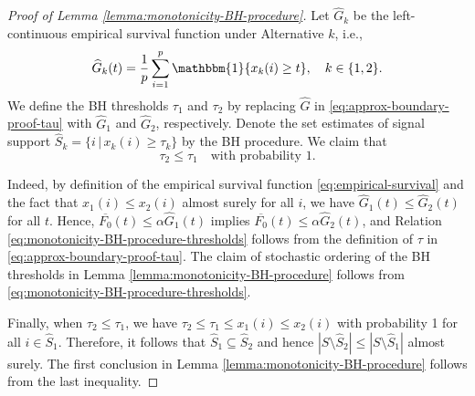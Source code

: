 \begin{proof}[Proof of Lemma \ref{lemma:monotonicity-BH-procedure}]
Let $\widehat{G}_k$ be the left-continuous empirical survival function under Alternative $k$, i.e.,
\begin{equation} \label{eq:empirical-survival}
    \widehat{G}_k(t) = \frac{1}{p}\sum_{i=1}^p\mathbbm{1}\{x_k(i) \ge t\}, \quad k\in\{1,2\}.
\end{equation}
We define the BH thresholds $\tau_1$ and $\tau_2$ by replacing $\widehat{G}$ in \eqref{eq:approx-boundary-proof-tau} with $\widehat{G}_1$ and $\widehat{G}_2$, respectively.
Denote the set estimates of signal support $\widehat{S}_k = \{i\,|\,x_k(i)\ge\tau_k\}$ by the BH procedure.
We claim that 
\begin{equation} \label{eq:monotonicity-BH-procedure-thresholds}
    \tau_2 \le \tau_1 \quad \text{with probability } 1.
\end{equation}

Indeed, by definition of the empirical survival function \eqref{eq:empirical-survival} and the fact that $x_1(i) \le x_2(i)$ almost surely for all $i$,  we have $\widehat{G}_1(t) \le \widehat{G}_2(t)$ for all $t$.
Hence, $\overline{F_0}(t)\le\alpha\widehat{G}_1(t)$ implies $\overline{F_0}(t)\le\alpha\widehat{G}_2(t)$, and Relation \eqref{eq:monotonicity-BH-procedure-thresholds} follows from the definition of $\tau$ in \eqref{eq:approx-boundary-proof-tau}.
The claim of stochastic ordering of the \ac{BH} thresholds in Lemma \ref{lemma:monotonicity-BH-procedure} follows from \eqref{eq:monotonicity-BH-procedure-thresholds}.

Finally, when $\tau_2 \le \tau_1$, we have $\tau_2 \le \tau_1 \le x_1(i) \le x_2(i)$ with probability 1 for all $i\in\widehat{S}_1$.
Therefore, it follows that $\widehat{S}_1 \subseteq \widehat{S}_2$ and hence $|S\setminus\widehat{S}_2| \le |S\setminus\widehat{S}_1|$ almost surely. 
The first conclusion in Lemma \ref{lemma:monotonicity-BH-procedure} follows from the last inequality.
\end{proof}

